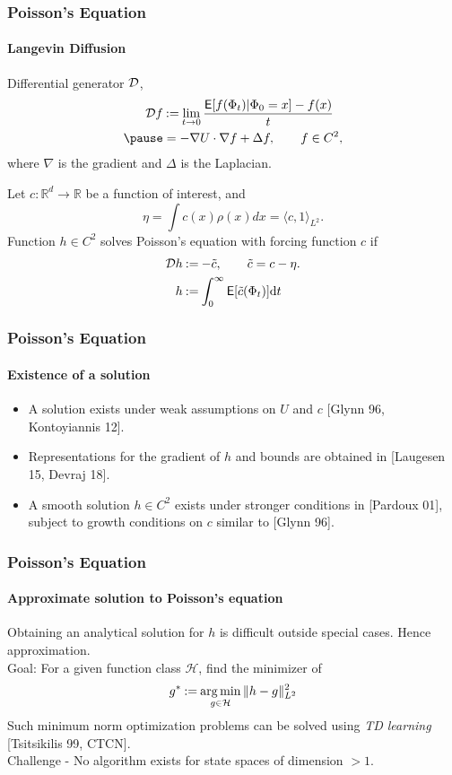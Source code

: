 \documentclass[xcolor=dvipsnames, subsection=false]{beamer}
\def\alertb#1{\alert{\color{BrickRed}  #1}}
\def\alertb#1{\alert{\color{BrickRed}  #1}}
\def\clH{{\mathcal H}}
\def\tilc{\tilde c}
\def\Expect{{\sf E}}
\newcommand{\field}[1]{\mathbb{#1}}
\def\Re{\field{R}}
\def\argmin{\mathop{\rm arg\, min}}
\def\eqdef{\mathbin{:=}}
\def\markovstate{\Phi}
\def\generate{{\cal D}}
\def\ud{\text{d}}
\newcommand{\pot}{U}
\newcommand{\pr}{\rho}
\def\Expect{{\sf E}}
\def\bl#1{{\color{blue}#1}}
\begin{document}
\begin{frame}
\frametitle{Poisson's Equation}
\framesubtitle{Langevin Diffusion}
\alertb{Differential generator} $\generate$,
\[
\begin{aligned}
 \generate f &\eqdef \lim_{t\to 0} \frac{\Expect [f(\Phi_t)| \Phi_0 = x] - f(x)}{t} \\ \pause
 & = -\nabla \pot \cdot \nabla f + \Delta f,\qquad f\in C^2,
\label{e:Lfish}
\end{aligned}
\]
where $\nabla$ is the gradient and $\Delta$ is the Laplacian. \pause

Let $c \colon \Re^d \to \Re$ be a function of interest, and
\[
\eta = \int c(x) \pr(x) dx = \langle c, 1 \rangle_{L^2}.
\] \pause
Function $h\in C^2$ solves \alertb{Poisson's equation} with forcing function $c$ if
\[
\begin{aligned}
\generate h &\eqdef - \tilc, \qquad  \tilc = c - \eta. \\
h & \eqdef \int_0^\infty \Expect [\tilc(\markovstate_t)] \ud t
\label{e:poissons}
\end{aligned}
\]
\end{frame}

\begin{frame}
\frametitle{Poisson's Equation}
\framesubtitle{Existence of a solution}
\begin{itemize}
\item A solution exists under weak assumptions on $\pot$ and $c$ \bl{\footnotesize{[Glynn 96, Kontoyiannis 12]}}.
\item Representations for the gradient of $h$ and bounds are obtained in \bl{\footnotesize{[Laugesen 15, Devraj 18]}}.
\item A smooth solution $h\in C^2$ exists under stronger conditions in \bl{\footnotesize{[Pardoux 01]}}, subject to growth conditions on $c$ similar to \bl{\footnotesize{[Glynn 96]}}.
\end{itemize}
\end{frame}

\begin{frame}
\frametitle{Poisson's Equation}
\framesubtitle{Approximate solution to Poisson's equation}
Obtaining an analytical solution for $h$ is difficult outside special cases. Hence approximation.\\[0.5cm] \pause
Goal: For a given function class $\clH$, find the minimizer of
\[
g^* \eqdef \argmin_{g \in \clH} \|h - g\|^2_{L^2}
\label{e:lstd1}
\]
Such minimum norm optimization problems can be solved using \textit{TD learning} \bl{\small{[Tsitsikilis 99, CTCN]}}.\\[0.5cm] \pause
\alertb{Challenge - No algorithm exists for state spaces of dimension $> 1$}.
\end{frame}
\end{document}
